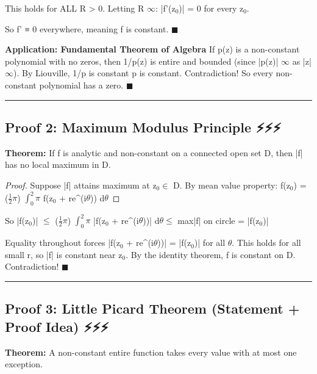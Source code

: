 \documentclass[12pt,a4paper,openany]{book}
\begin{document}
{{This holds for ALL R > 0. Letting R  $\infty$: |f'(z$_0$)| = 0 for every z$_0$.

So f' ≡ 0 everywhere, meaning f is constant. $\blacksquare$

\textbf{Application: Fundamental Theorem of Algebra}
If p(z) is a non-constant polynomial with no zeros, then 1/p(z) is entire and bounded (since |p(z)|  $\infty$ as |z|  $\infty$). By Liouville, 1/p is constant  p is constant. Contradiction! So every non-constant polynomial has a zero. $\blacksquare$

\bigskip\noindent\rule{\textwidth}{0.4pt}\bigskip

\subsection{Proof 2: Maximum Modulus Principle ⚡⚡⚡}

\begin{tcolorbox}[colback=lightblue,colframe=thmblue,title=\textbf{Theorem},breakable,boxrule=1.5pt]
\textbf{Theorem:} If f is analytic and non-constant on a connected open set D, then |f| has no local maximum in D.
\end{tcolorbox}

\begin{proof}

Suppose |f| attains maximum at z$_0\in$ D. By mean value property:
f(z$_0$) = ($\frac{1}{2}$$\pi$) $\int_0^2\pi$ f(z$_0$ + re^(i$\theta$)) d$\theta$
\end{proof}

So |f(z$_0$)| $\leq$ ($\frac{1}{2}$$\pi$) $\int_0^2\pi$ |f(z$_0$ + re^(i$\theta$))| d$\theta\leq$ max|f| on circle = |f(z$_0$)|

Equality throughout forces |f(z$_0$ + re^(i$\theta$))| = |f(z$_0$)| for all $\theta$. This holds for all small r, so |f| is constant near z$_0$. By the identity theorem, f is constant on D. Contradiction! $\blacksquare$

\bigskip\noindent\rule{\textwidth}{0.4pt}\bigskip

\subsection{Proof 3: Little Picard Theorem (Statement + Proof Idea) ⚡⚡⚡}

\begin{tcolorbox}[colback=lightblue,colframe=thmblue,title=\textbf{Theorem},breakable,boxrule=1.5pt]
\textbf{Theorem:} A non-constant entire function takes every value with at most one exception.
\end{tcolorbox}

}}
\end{document}

